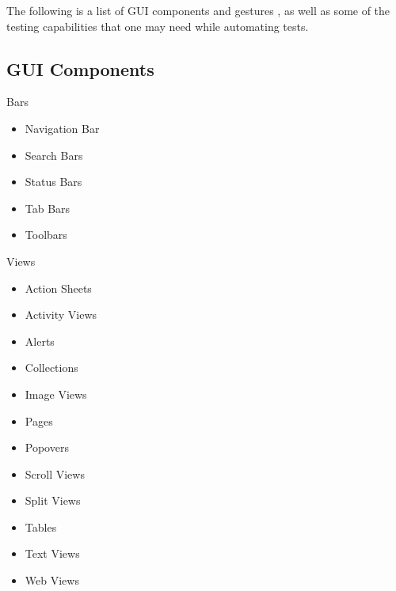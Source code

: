 The following is a list of GUI components and gestures \cite{AppleHumanInterface}, as well as some of the testing capabilities that one may need while automating tests.

\subsection {GUI Components}
	
	Bars
	\begin{itemize}
  		\vspace{-0.4cm}\item Navigation Bar
  		\vspace{-0.4cm}\item Search Bars
		\vspace{-0.4cm}\item Status Bars
		\vspace{-0.4cm}\item Tab Bars
		\vspace{-0.4cm}\item Toolbars
	\end{itemize}

	Views
	\begin{itemize}
  		\vspace{-0.4cm}\item Action Sheets
		\vspace{-0.4cm}\item Activity Views
		\vspace{-0.4cm}\item Alerts
		\vspace{-0.4cm}\item Collections
		\vspace{-0.4cm}\item Image Views
		\vspace{-0.4cm}\item Pages
		\vspace{-0.4cm}\item Popovers
		\vspace{-0.4cm}\item Scroll Views
		\vspace{-0.4cm}\item Split Views
		\vspace{-0.4cm}\item Tables
		\vspace{-0.4cm}\item Text Views
		\vspace{-0.4cm}\item Web Views
	\end{itemize}
	
